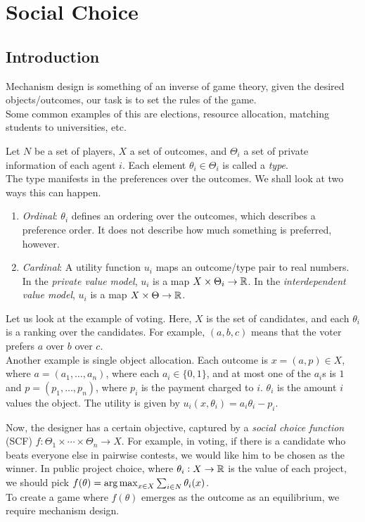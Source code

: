 \section{Social Choice}

\subsection{Introduction}

	Mechanism design is something of an inverse of game theory, given the desired objects/outcomes, our task is to set the rules of the game.\\
	Some common examples of this are elections, resource allocation, matching students to universities, etc.

	Let $N$ be a set of players, $X$ a set of outcomes, and $\Theta_i$ a set of private information of each agent $i$. Each element $\theta_i \in \Theta_i$ is called a \emph{type}.\\

	The type manifests in the preferences over the outcomes. We shall look at two ways this can happen.
	\begin{enumerate}
	 	\item \emph{Ordinal}: $\theta_i$ defines an ordering over the outcomes, which describes a preference order. It does not describe how much something is preferred, however.
	 	\item \emph{Cardinal}: A utility function $u_i$ maps an outcome/type pair to real numbers. In the \emph{private value model}, $u_i$ is a map $X \times \Theta_i \to \mathbb{R}$. In the \emph{interdependent value model}, $u_i$ is a map $X \times \Theta \to \mathbb{R}$.
	\end{enumerate}

	\begin{fex}
		Let us look at the example of voting. Here, $X$ is the set of candidates, and each $\theta_i$ is a ranking over the candidates. For example, $(a,b,c)$ means that the voter prefers $a$ over $b$ over $c$. \\
		Another example is single object allocation. Each outcome is $x = (a,p) \in X$, where $a = (a_1,\ldots,a_n)$, where each $a_i \in \{0,1\}$, and at most one of the $a_i$s is $1$ and $p = (p_1,\ldots,p_n)$, where $p_i$ is the payment charged to $i$. $\theta_i$ is the amount $i$ values the object. The utility is given by $u_i(x,\theta_i) = a_i\theta_i - p_i$.
	\end{fex}

	Now, the designer has a certain objective, captured by a \emph{social choice function} (SCF) $f : \Theta_1 \times \cdots \times \Theta_n \to X$. For example, in voting, if there is a candidate who beats everyone else in pairwise contests, we would like him to be chosen as the winner. In public project choice, where $\theta_i : X \to \mathbb{R}$ is the value of each project, we should pick $f(\theta) = \operatorname*{arg\,max}_{x \in X} \sum_{i \in N} \theta_i(x)$.\\
	To create a game where $f(\theta)$ emerges as the outcome as an equilibrium, we require mechanism design.

